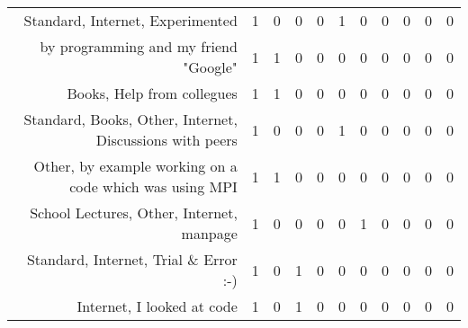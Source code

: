 {\begin{landscape}
\begin{longtable}[htb]{r|c|c|c|c|c|c|c|c|c|c}
{Standard, Internet, Experimented} & 1 & 0 & 0 & 0 & 1 & 0 & 0 & 0 & 0 & 0 \\%
{by programming and my friend "Google"} & 1 & 1 & 0 & 0 & 0 & 0 & 0 & 0 & 0 & 0 \\%
{Books, Help from collegues} & 1 & 1 & 0 & 0 & 0 & 0 & 0 & 0 & 0 & 0 \\%
{Standard, Books, Other, Internet, Discussions with peers} & 1 & 0 & 0 & 0 & 1 & 0 & 0 & 0 & 0 & 0 \\%
{Other, by example working on a code which was using MPI} & 1 & 1 & 0 & 0 & 0 & 0 & 0 & 0 & 0 & 0 \\%
{School Lectures, Other, Internet, manpage} & 1 & 0 & 0 & 0 & 0 & 1 & 0 & 0 & 0 & 0 \\%
{Standard, Internet, Trial \& Error :-)} & 1 & 0 & 1 & 0 & 0 & 0 & 0 & 0 & 0 & 0 \\%
{Internet, I looked at code} & 1 & 0 & 1 & 0 & 0 & 0 & 0 & 0 & 0 & 0 \\%
\hline%
\end{longtable}%
\end{landscape}}%
\clearpage%
